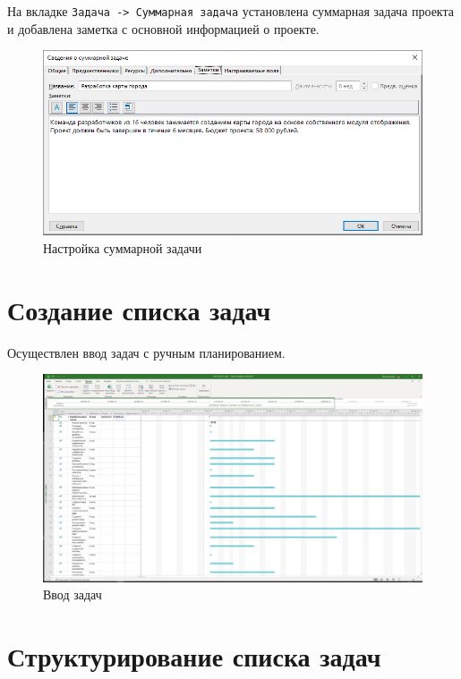 На вкладке \texttt{Задача -> Суммарная задача} установлена суммарная задача проекта и добавлена заметка с основной информацией о проекте.

\begin{figure}[H]
	\begin{center}
		\includegraphics[width=\textwidth]{imgs/task_1_3.png}
	\end{center}
	\caption{Настройка суммарной задачи}
	\label{img:label}
\end{figure}

\section{Создание списка задач}

Осуществлен ввод задач с ручным планированием.

\begin{figure}[H]
	\begin{center}
		\includegraphics[width=\textwidth]{imgs/task_2_0.png}
	\end{center}
	\caption{Ввод задач}
	\label{img:label}
\end{figure}

\section{Структурирование списка задач}

